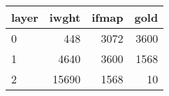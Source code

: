 \begin{tabular}{lrrr}
\toprule
layer &  iwght &  ifmap &  gold \\
\midrule
    0 &    448 &   3072 &  3600 \\
    1 &   4640 &   3600 &  1568 \\
    2 &  15690 &   1568 &    10 \\
\bottomrule
\end{tabular}
